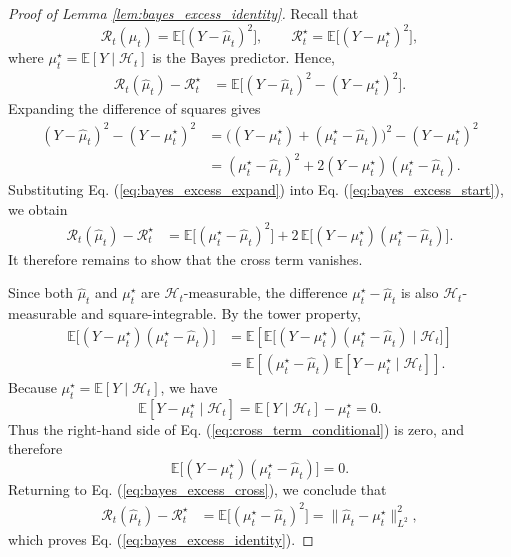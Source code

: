 \documentclass{llmxive}
\providecommand{\E}{\mathbb{E}}
\providecommand{\cH}{\mathcal{H}}
\begin{document}
\begin{proof}[Proof of Lemma \ref{lem:bayes_excess_identity}]
Recall that
\[
\mathcal R_t(\hat\mu_t)=\E\bigl[(Y-\hat\mu_t)^2\bigr],
\qquad
\mathcal R_t^\star=\E\bigl[(Y-\mu_t^\star)^2\bigr],
\]
where $\mu_t^\star=\E[Y\mid \cH_t]$ is the Bayes predictor. Hence,
\begin{align}
\mathcal R_t(\hat\mu_t)-\mathcal R_t^\star
&=
\E\bigl[(Y-\hat\mu_t)^2-(Y-\mu_t^\star)^2\bigr].
\label{eq:bayes_excess_start}
\end{align}
Expanding the difference of squares gives
\begin{align}
(Y-\hat\mu_t)^2-(Y-\mu_t^\star)^2
&=
\bigl((Y-\mu_t^\star)+(\mu_t^\star-\hat\mu_t)\bigr)^2-(Y-\mu_t^\star)^2
\nonumber\\
&=
(\mu_t^\star-\hat\mu_t)^2
+
2(Y-\mu_t^\star)(\mu_t^\star-\hat\mu_t).
\label{eq:bayes_excess_expand}
\end{align}
Substituting Eq. (\ref{eq:bayes_excess_expand}) into Eq. (\ref{eq:bayes_excess_start}), we obtain
\begin{align}
\mathcal R_t(\hat\mu_t)-\mathcal R_t^\star
&=
\E\bigl[(\mu_t^\star-\hat\mu_t)^2\bigr]
+
2\,\E\bigl[(Y-\mu_t^\star)(\mu_t^\star-\hat\mu_t)\bigr].
\label{eq:bayes_excess_cross}
\end{align}
It therefore remains to show that the cross term vanishes.

Since both $\hat\mu_t$ and $\mu_t^\star$ are $\cH_t$-measurable, the difference
$\mu_t^\star-\hat\mu_t$ is also $\cH_t$-measurable and square-integrable. By the tower property,
\begin{align}
\E\bigl[(Y-\mu_t^\star)(\mu_t^\star-\hat\mu_t)\bigr]
&=
\E\!\left[
\E\bigl[(Y-\mu_t^\star)(\mu_t^\star-\hat\mu_t)\mid \cH_t\bigr]
\right]
\nonumber\\
&=
\E\!\left[
(\mu_t^\star-\hat\mu_t)\,\E[Y-\mu_t^\star\mid \cH_t]
\right].
\label{eq:cross_term_conditional}
\end{align}
Because $\mu_t^\star=\E[Y\mid \cH_t]$, we have
\[
\E[Y-\mu_t^\star\mid \cH_t]
=
\E[Y\mid \cH_t]-\mu_t^\star
=
0.
\]
Thus the right-hand side of Eq. (\ref{eq:cross_term_conditional}) is zero, and therefore
\[
\E\bigl[(Y-\mu_t^\star)(\mu_t^\star-\hat\mu_t)\bigr]=0.
\]
Returning to Eq. (\ref{eq:bayes_excess_cross}), we conclude that
\begin{align}
\mathcal R_t(\hat\mu_t)-\mathcal R_t^\star
&=
\E\bigl[(\mu_t^\star-\hat\mu_t)^2\bigr]
=
\|\hat\mu_t-\mu_t^\star\|_{L^2}^2,
\end{align}
which proves Eq. (\ref{eq:bayes_excess_identity}).
\end{proof}
\end{document}

